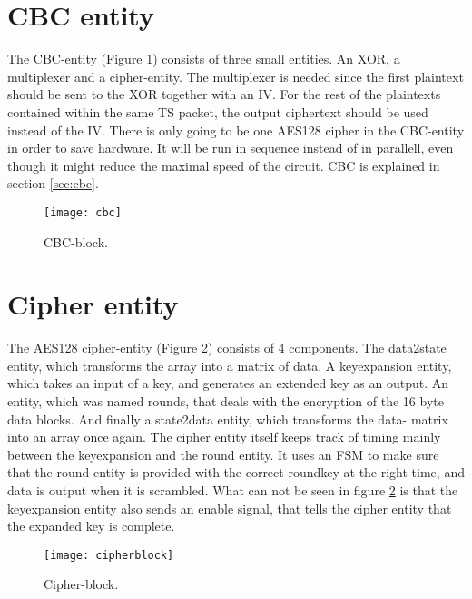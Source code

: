 \section{CBC entity}
The CBC-entity (Figure \ref{block:cbc}) consists of three small 
entities. An XOR, a multiplexer and a cipher-entity. The multiplexer 
is needed since the first plaintext should be sent to the XOR together 
with an IV. For the rest of the plaintexts contained within the same 
TS packet, the output ciphertext should be used instead of the IV. 
There is only going to be one AES128 cipher in the CBC-entity in 
order to save hardware. It will be run in sequence instead of in 
parallell, even though it might reduce the maximal speed of the 
circuit. CBC is explained in section \ref{sec:cbc}.

\begin{figure}[h!]
  \centering
  \texttt{[image: cbc]}
  \caption{CBC-block.}
  \label{block:cbc}
\end{figure}

\section{Cipher entity}
The AES128 cipher-entity (Figure \ref{block:cipher}) consists of 4 
components. The data2state entity, which transforms the array into a 
matrix of data. A keyexpansion entity, which takes an input of a key, 
and generates an extended key as an output. An entity, which was 
named rounds, that deals with the encryption of the 16 byte data 
blocks. And finally a state2data entity, which transforms the data-
matrix into an array once again. The cipher entity itself keeps track 
of timing mainly between the keyexpansion and the round entity. It 
uses an FSM to make sure that the round entity is provided with the 
correct roundkey at the right time, and data is output when 
it is scrambled. What can not be seen in figure \ref{block:cipher} is 
that the keyexpansion entity also sends an enable signal, that tells 
the cipher entity that the expanded key is complete.

\begin{figure}[h!]
  \centering
  \texttt{[image: cipherblock]}
  \caption{Cipher-block.}
  \label{block:cipher}
\end{figure}

